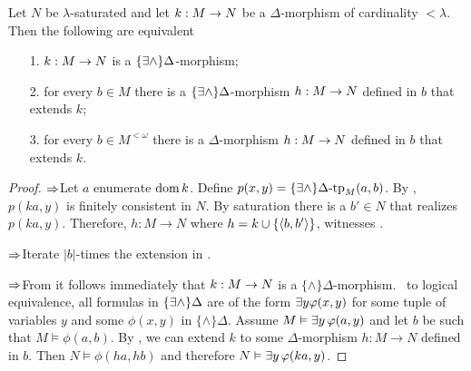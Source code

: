 % 

\begin{proposition}\label{prop_EDelta_estensione}
Let $N$ be $\lambda$-saturated and let $k:M\rightarrow N$ be a $\Delta$-morphism of cardinality $<\lambda$. Then the following are equivalent
\begin{itemize}
\item[1.] $k:M\rightarrow N$ is a $\{\exists\wedge\}\Delta$-morphism;
\item[2.] for every $b\in M$ there is a $\{\exists\wedge\}\Delta$-morphism $h:M\rightarrow N$ defined in $b$ that extends $k$;
\item[3.] for every $b\in M^{<\omega}$ there is a $\Delta$-morphism $h:M\rightarrow N$ defined in $b$ that extends $k$.
\end{itemize}
\end{proposition}

\begin{proof}
$\Rightarrow$\quad Let $a$ enumerate $\mathop{\rm dom} k$. Define $p(x,y)=\{\exists\wedge\}\Delta\mbox{-}\textrm{tp}_M (a,b)$. By , $p(ka,y)$ is finitely consistent in $N$. By saturation there is a $b'\in N$ that realizes $p(ka,y)$. Therefore, $h:M\to N$ where $h=k\cup\{\langle b,b'\rangle\}$, witnesses .

$\Rightarrow$\quad Iterate $|b|$-times the extension in . 

$\Rightarrow$\quad From  it follows immediately that $k:M\rightarrow N$ is a $\{\wedge\}\Delta$-morphism.  \ to logical equivalence, all formulas in $\{\exists\wedge\}\Delta$ are of the form  $\exists y \varphi (x,y)$ for some tuple of variables $y$ and some $\phi(x,y)$ in $\{\wedge\}\Delta$. Assume $M\vDash\exists y\,\varphi(a,y)$ and let $b$ be such that $M\models\phi(a,b)$. By , we can extend $k$ to some $\Delta$-morphism $h:M\to N$ defined in $b$. Then $N\models\phi(ha,hb)$ and therefore $N\vDash\exists y\,\varphi(ka,y)$.
\end{proof}

